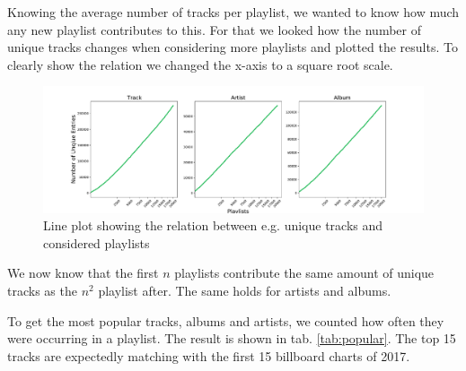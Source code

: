 Knowing the average number of tracks per playlist, we wanted to know how much any new playlist contributes to this. For that we looked how the number of unique tracks changes when considering more playlists and plotted the results. To clearly show the relation we changed the x-axis to a square root scale.

\begin{figure}[ht]
    \centering
    \includegraphics[width=\textwidth]{fig/unique_to_playlist.pdf}
    \caption{Line plot showing the relation between e.g. unique tracks and considered playlists}
    \label{fig:unique_to_playlist}
\end{figure}

We now know that the first $n$ playlists contribute the same amount of unique tracks as the $n^2$ playlist after. The same holds for artists and albums.


To get the most popular tracks, albums and artists, we counted how often they were occurring in a playlist. The result is shown in tab. \ref{tab:popular}. The top 15 tracks are expectedly matching with the first 15 billboard charts of 2017.\citep{BillboardMedia}

